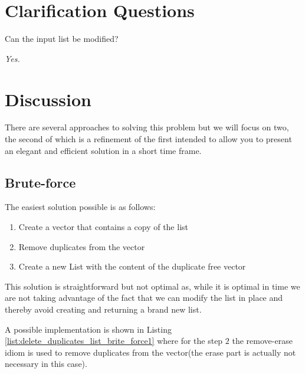 \section{Clarification Questions}

\begin{QandA}
	\item \begin{questionitem} \begin{question} Can the input list be modified?  \end{question} 	 
    \begin{answered}
		\textit{Yes.}
	\end{answered} \end{questionitem}
	
\end{QandA}

\section{Discussion}
\label{delete_duplicates_list:sec:discussion}
There are several approaches to solving this problem but we will focus on two, the second of which is a refinement of the first intended to allow you to present an elegant and efficient solution in a short time frame.

\subsection{Brute-force}
\label{delete_duplicates_list:sec:bruteforce}
The easiest solution possible is as follows:
\begin{enumerate}
	\item Create a vector that contains a copy of the list
	\item Remove duplicates from the vector
	\item Create a new List with the content of the duplicate free vector
\end{enumerate}
This solution is straightforward but not optimal as, while it is optimal in time we are not taking advantage of the fact that we can modify the list in place and thereby avoid creating and returning a brand new list.  

A possible implementation is shown in Listing \ref{list:delete_duplicates_list_brite_force1} where for the step $2$ the  remove-erase idiom\cite{cit::wiki::remove-erase} is used to remove duplicates from the vector(the erase part is actually not necessary in this case).

